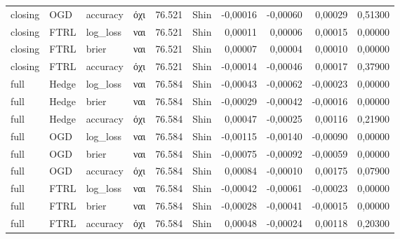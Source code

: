 {\begin{longtable}{@{}llllrlrrrr@{}}
closing & OGD & accuracy & όχι & 76.521 & Shin & -0,00016 & -0,00060 & 0,00029 & 0,51300 \\
closing & FTRL & log\_loss & ναι & 76.521 & Shin & 0,00011 & 0,00006 & 0,00015 & 0,00000 \\
closing & FTRL & brier & ναι & 76.521 & Shin & 0,00007 & 0,00004 & 0,00010 & 0,00000 \\
closing & FTRL & accuracy & όχι & 76.521 & Shin & -0,00014 & -0,00046 & 0,00017 & 0,37900 \\
full & Hedge & log\_loss & ναι & 76.584 & Shin & -0,00043 & -0,00062 & -0,00023 & 0,00000 \\
full & Hedge & brier & ναι & 76.584 & Shin & -0,00029 & -0,00042 & -0,00016 & 0,00000 \\
full & Hedge & accuracy & όχι & 76.584 & Shin & 0,00047 & -0,00025 & 0,00116 & 0,21900 \\
full & OGD & log\_loss & ναι & 76.584 & Shin & -0,00115 & -0,00140 & -0,00090 & 0,00000 \\
full & OGD & brier & ναι & 76.584 & Shin & -0,00075 & -0,00092 & -0,00059 & 0,00000 \\
full & OGD & accuracy & όχι & 76.584 & Shin & 0,00084 & -0,00010 & 0,00175 & 0,07900 \\
full & FTRL & log\_loss & ναι & 76.584 & Shin & -0,00042 & -0,00061 & -0,00023 & 0,00000 \\
full & FTRL & brier & ναι & 76.584 & Shin & -0,00028 & -0,00041 & -0,00015 & 0,00000 \\
full & FTRL & accuracy & όχι & 76.584 & Shin & 0,00048 & -0,00024 & 0,00118 & 0,20300 \\
\end{longtable}
}

